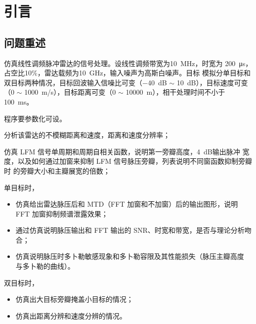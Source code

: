 \documentclass[../main]{subfiles}
\begin{document}
\chapter{引言}%
\label{cha:introduction}

\section{问题重述}%
\label{sec:problem}

仿真线性调频脉冲雷达的信号处理。设线性调频带宽为\SI{10}{\MHz}，时宽为
\SI{200}{\us}，占空比10\%，雷达载频为\SI{10}{\GHz}，输入噪声为高斯白噪声。目标
模拟分单目标和双目标两种情况，目标回波输入信噪比可变（\SI{-40}{\dB} $\sim$
\SI{10}{\dB}），目标速度可变（0 $\sim$ \SI{1000}{\m/\s}），目标距离可变（0
$\sim$ \SI{10000}{\m}），相干处理时间不小于\SI{100}{\ms}。

程序要参数化可设。

\begin{Exercise}[label = ex:1]
  分析该雷达的不模糊距离和速度，距离和速度分辨率；
\end{Exercise}

\begin{Exercise}[label = ex:2]
  仿真 LFM 信号单周期和周期自相关函数，说明第一旁瓣高度，\SI{4}{\dB}输出脉冲
  宽度，以及如何通过加窗来抑制 LFM 信号脉压旁瓣，列表说明不同窗函数抑制旁瓣时
  的旁瓣大小和主瓣展宽的倍数；
\end{Exercise}

\begin{Exercise}[label = ex:3]
  单目标时，
  \begin{itemize}
    \item 仿真给出雷达脉压后和 MTD（FFT 加窗和不加窗）后的输出图形，说明 FFT
      加窗抑制频谱泄露效果；
    \item 通过仿真说明脉压输出和 FFT 输出的 SNR、时宽和带宽，是否与理论分析吻
      合；
    \item 仿真说明脉压时多卜勒敏感现象和多卜勒容限及其性能损失（脉压主瓣高度
      与多卜勒的曲线）。
  \end{itemize}
\end{Exercise}

\begin{Exercise}[label = ex:4]
  双目标时，
  \begin{itemize}
    \item 仿真出大目标旁瓣掩盖小目标的情况；
    \item 仿真出距离分辨和速度分辨的情况。
  \end{itemize}
\end{Exercise}
\end{document}
